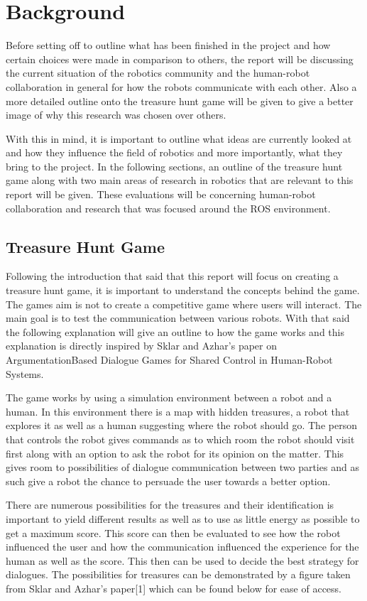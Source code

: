 \chapter{Background}
Before setting off to outline what has been finished in the project and how certain choices were made in comparison to others, the report will be discussing the current situation of the robotics community and the human-robot collaboration in general for how the robots communicate with each other. Also a more detailed outline onto the treasure hunt game will be given to give a better image of why this research was chosen over others.

    With this in mind, it is important to outline what ideas are currently looked at and how they influence the field of robotics and more importantly, what they bring to the project. In the following sections, an outline of the treasure hunt game along with two main areas of research in robotics that are relevant to this report will be given. These evaluations will be concerning human-robot collaboration and research that was focused around the ROS environment.

    \section{Treasure Hunt Game}
      Following the introduction that said that this report will focus on creating a treasure hunt game, it is important to understand the concepts behind the game. The games aim is not to create a competitive game where users will interact. The main goal is to test the communication between various robots. With that said the following explanation will give an outline to how the game works and this explanation is directly inspired by Sklar and Azhar’s paper on ArgumentationBased Dialogue Games for Shared Control in Human-Robot Systems.

      The game works by using a simulation environment between a robot and a human. In this environment there is a map with hidden treasures, a robot that explores it as well as a human suggesting where the robot should go. The person that controls the robot gives commands as to which room the robot should visit first along with an option to ask the robot for its opinion on the matter. This gives room to possibilities of dialogue communication between two parties and as such give a robot the chance to persuade the user towards a better option.

      There are numerous possibilities for the treasures and their identification is important to yield different results as well as to use as little energy as possible to get a maximum score. This score can then be evaluated to see how the robot influenced the user and how the communication influenced the experience for the human as well as the score. This then can be used to decide the best strategy for dialogues. The possibilities for treasures can be demonstrated by a figure taken from Sklar and Azhar’s paper[1] which can be found below for ease of access.

